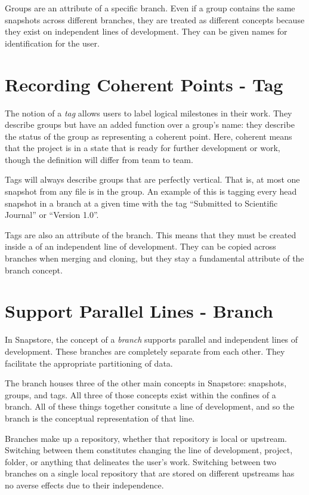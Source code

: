 Groups are an attribute of a specific branch. Even if a group contains the same snapshots across different branches, they are treated as different concepts because they exist on independent lines of development. They can be given names for identification for the user.

\section{Recording Coherent Points - Tag}

The notion of a \textit{tag} allows users to label logical milestones in their work. They describe groups but have an added function over a group's name: they describe the status of the group as representing a coherent point. Here, coherent means that the project is in a state that is ready for further development or work, though the definition will differ from team to team\cite{RossoJackson}. 

Tags will always describe groups that are perfectly vertical. That is, at most one snapshot from any file is in the group. An example of this is tagging every head snapshot in a branch at a given time with the tag ``Submitted to Scientific Journal'' or ``Version 1.0''.

Tags are also an attribute of the branch. This means that they must be created inside a of an independent line of development. They can be copied across branches when merging and cloning, but they stay a fundamental attribute of the branch concept.

\section{Support Parallel Lines - Branch}

In Snapstore, the concept of a \textit{branch} supports parallel and independent lines of development. These branches are completely separate from each other. They facilitate the appropriate partitioning of data.

The branch houses three of the other main concepts in Snapstore: snapshots, groups, and tags. All three of those concepts exist within the confines of a branch. All of these things together consitute a line of development, and so the branch is the conceptual representation of that line.

Branches make up a repository, whether that repository is local or upstream. Switching between them constitutes changing the line of development, project, folder, or anything that delineates the user's work. Switching between two branches on a single local repository that are stored on different upstreams has no averse effects due to their independence.

